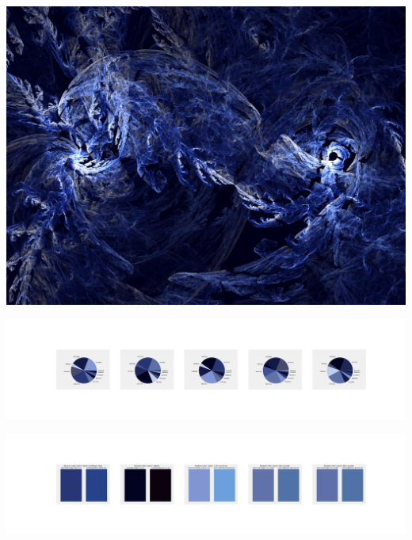 \documentclass[11pt]{article}
\begin{document}
\begin{landscape}
    \begin{center}
    \includegraphics[width=\textwidth]{./nbimg/file (204).jpg}
    \end{center}

    \begin{center}
    \includegraphics[width=250mm]{./nbimg/pie-117.jpg}
    \end{center}

    \begin{center}
    \includegraphics[width=250mm]{./nbimg/peak-117.jpg}
    \end{center}
    


\end{landscape}
\end{document}

